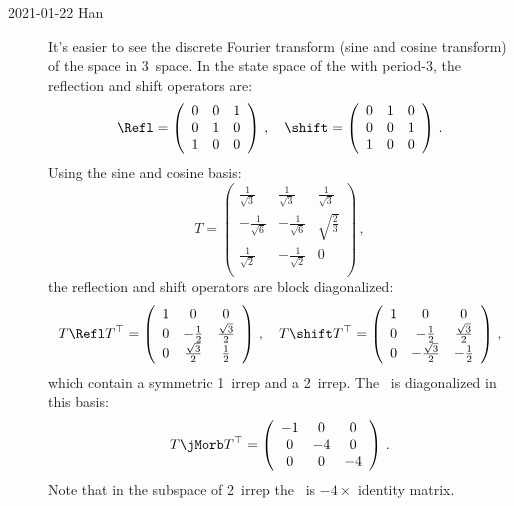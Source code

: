\begin{description}
    \item[2021-01-22 Han]
It's easier to see the discrete Fourier transform  (sine and cosine
transform) of the {\lattstate} space in 3\dmn\ space. In the state space
of the {\lattstate} with period-3, the reflection and shift operators
are:
\[
{\Refl}=
\left(
\begin{array}{ccc}
 0 & 0 & 1 \\
 0 & 1 & 0 \\
 1 & 0 & 0 \\
\end{array}
\right)\,,
\quad
\shift=
\left(
\begin{array}{ccc}
 0 & 1 & 0 \\
 0 & 0 & 1 \\
 1 & 0 & 0 \\
\end{array}
\right) \,.
\]
Using the sine and cosine basis:
\[
T=
\left(
\begin{array}{ccc}
 \frac{1}{\sqrt{3}} & \frac{1}{\sqrt{3}} & \frac{1}{\sqrt{3}} \\
 -\frac{1}{\sqrt{6}} & -\frac{1}{\sqrt{6}} & \sqrt{\frac{2}{3}} \\
 \frac{1}{\sqrt{2}} & -\frac{1}{\sqrt{2}} & 0 \\
\end{array}
\right) \,,
\]
the reflection and shift operators are block diagonalized:
\[
T{\Refl}T^{\top}=
\left(
\begin{array}{ccc}
 1 & 0 & 0 \\
 0 & -\frac{1}{2} & \frac{\sqrt{3}}{2} \\
 0 & \frac{\sqrt{3}}{2} & \frac{1}{2} \\
\end{array}
\right)\,,
\quad
T \shift T^{\top} =
\left(
\begin{array}{ccc}
 1 & 0 & 0 \\
 0 & -\frac{1}{2} & \frac{\sqrt{3}}{2} \\
 0 & -\frac{\sqrt{3}}{2} & -\frac{1}{2} \\
\end{array}
\right) \,,
\]
which contain a symmetric 1\dmn\ irrep and a 2\dmn\ irrep. The \jacobianOrb\ is diagonalized
in this basis:
\[
T \jMorb T^{\top} =
\left(
\begin{array}{ccc}
 -1 & 0 & 0 \\
 0 & -4 & 0 \\
 0 & 0 & -4 \\
\end{array}
\right) \,.
\]
Note that in the subspace of 2\dmn\ irrep the \jacobianOrb\ is $-4 \times$ identity matrix.


\end{description}
